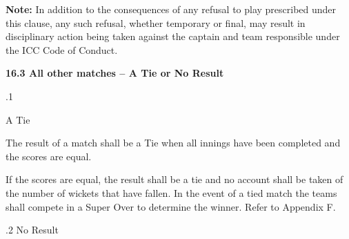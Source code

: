 \documentclass[12pt]{article}
\begin{document}
\vspace{\baselineskip}
\begin{adjustwidth}{0.5in}{0.31in}
{\fontsize{9pt}{10.8pt}\selectfont \textbf{Note: }In addition to the consequences of any refusal to play prescribed under this clause, any such\textbf{ }refusal, whether temporary or final, may result in disciplinary action being taken against the captain and team responsible under the ICC Code of Conduct.\par}\par

\end{adjustwidth}


\vspace{\baselineskip}
{\fontsize{11pt}{13.2pt}\selectfont \textbf{16.3 \tabto{0.47in} All other matches – A Tie or No Result}\par}\par


\vspace{\baselineskip}
{\fontsize{9pt}{10.8pt}.1 \tabto{0.49in} {\fontsize{8pt}{9.6pt}\selectfont A Tie\par}\par}\par


\vspace{\baselineskip}
\begin{adjustwidth}{0.5in}{0.0in}
{\fontsize{9pt}{10.8pt}\selectfont The result of a match shall be a Tie when all innings have been completed and the scores are equal.\par}\par

\end{adjustwidth}


\vspace{\baselineskip}
\begin{adjustwidth}{0.5in}{0.11in}
\begin{justify}
{\fontsize{9pt}{10.8pt}\selectfont If the scores are equal, the result shall be a tie and no account shall be taken of the number of wickets that have fallen. In the event of a tied match the teams shall compete in a Super Over to determine the winner. Refer to Appendix F.\par}
\end{justify}\par

\end{adjustwidth}


\vspace{\baselineskip}
{\fontsize{9pt}{10.8pt}.2 \tabto{0.49in} No Result\par}\par
\end{document}
